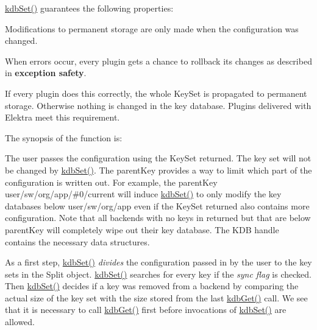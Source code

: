 {\ttfamily \mbox{\hyperlink{group__kdb_ga11436b058408f83d303ca5e996832bcf}{kdb\+Set()}}} guarantees the following properties\+:


\begin{DoxyItemize}
\item Modifications to permanent storage are only made when the configuration was changed.
\item When errors occur, every plugin gets a chance to rollback its changes as described in {\bfseries{exception safety}}.
\item If every plugin does this correctly, the whole {\ttfamily Key\+Set} is propagated to permanent storage. Otherwise nothing is changed in the key database. Plugins delivered with Elektra meet this requirement.
\end{DoxyItemize}

The synopsis of the function is\+:


\begin{DoxyCode}{0}
\end{DoxyCode}


The user passes the configuration using the {\ttfamily Key\+Set} {\ttfamily returned}. The key set will not be changed by {\ttfamily \mbox{\hyperlink{group__kdb_ga11436b058408f83d303ca5e996832bcf}{kdb\+Set()}}}. The {\ttfamily parent\+Key} provides a way to limit which part of the configuration is written out. For example, the {\ttfamily parent\+Key} {\ttfamily user/sw/org/app/\#0/current} will induce {\ttfamily \mbox{\hyperlink{group__kdb_ga11436b058408f83d303ca5e996832bcf}{kdb\+Set()}}} to only modify the key databases below {\ttfamily user/sw/org/app} even if the {\ttfamily Key\+Set} {\ttfamily returned} also contains more configuration. Note that all backends with no keys in {\ttfamily returned} but that are below {\ttfamily parent\+Key} will completely wipe out their key database. The {\ttfamily K\+DB} handle contains the necessary data structures.

As a first step, {\ttfamily \mbox{\hyperlink{group__kdb_ga11436b058408f83d303ca5e996832bcf}{kdb\+Set()}}} {\itshape divides} the configuration passed in by the user to the key sets in the {\ttfamily Split} object. {\ttfamily \mbox{\hyperlink{group__kdb_ga11436b058408f83d303ca5e996832bcf}{kdb\+Set()}}} searches for every key if the {\itshape sync flag} is checked. Then {\ttfamily \mbox{\hyperlink{group__kdb_ga11436b058408f83d303ca5e996832bcf}{kdb\+Set()}}} decides if a key was removed from a backend by comparing the actual size of the key set with the size stored from the last {\ttfamily \mbox{\hyperlink{group__kdb_ga28e385fd9cb7ccfe0b2f1ed2f62453a1}{kdb\+Get()}}} call. We see that it is necessary to call {\ttfamily \mbox{\hyperlink{group__kdb_ga28e385fd9cb7ccfe0b2f1ed2f62453a1}{kdb\+Get()}}} first before invocations of {\ttfamily \mbox{\hyperlink{group__kdb_ga11436b058408f83d303ca5e996832bcf}{kdb\+Set()}}} are allowed.

